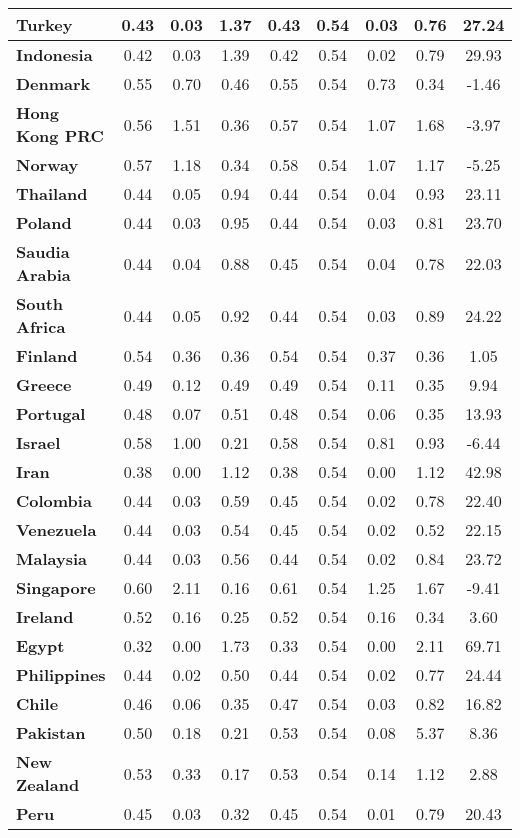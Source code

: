 \documentclass{article}
\begin{document}
\begin{center}
\begin{table}
\begin{small}
\begin{tabular}{|l|c|c|c|c|c|c|c|c|}
\textbf{Turkey}&0.43&0.03&1.37&0.43&0.54&0.03&0.76&27.24\\\hline
\textbf{Indonesia}&0.42&0.03&1.39&0.42&0.54&0.02&0.79&29.93\\\hline
\textbf{Denmark}&0.55&0.70&0.46&0.55&0.54&0.73&0.34&-1.46\\\hline
\textbf{Hong Kong PRC}&0.56&1.51&0.36&0.57&0.54&1.07&1.68&-3.97\\\hline
\textbf{Norway}&0.57&1.18&0.34&0.58&0.54&1.07&1.17&-5.25\\\hline
\textbf{Thailand}&0.44&0.05&0.94&0.44&0.54&0.04&0.93&23.11\\\hline
\textbf{Poland}&0.44&0.03&0.95&0.44&0.54&0.03&0.81&23.70\\\hline
\textbf{Saudia Arabia}&0.44&0.04&0.88&0.45&0.54&0.04&0.78&22.03\\\hline
\textbf{South Africa}&0.44&0.05&0.92&0.44&0.54&0.03&0.89&24.22\\\hline
\textbf{Finland}&0.54&0.36&0.36&0.54&0.54&0.37&0.36&1.05\\\hline
\textbf{Greece}&0.49&0.12&0.49&0.49&0.54&0.11&0.35&9.94\\\hline
\textbf{Portugal}&0.48&0.07&0.51&0.48&0.54&0.06&0.35&13.93\\\hline
\textbf{Israel}&0.58&1.00&0.21&0.58&0.54&0.81&0.93&-6.44\\\hline
\textbf{Iran}&0.38&0.00&1.12&0.38&0.54&0.00&1.12&42.98\\\hline
\textbf{Colombia}&0.44&0.03&0.59&0.45&0.54&0.02&0.78&22.40\\\hline
\textbf{Venezuela}&0.44&0.03&0.54&0.45&0.54&0.02&0.52&22.15\\\hline
\textbf{Malaysia}&0.44&0.03&0.56&0.44&0.54&0.02&0.84&23.72\\\hline
\textbf{Singapore}&0.60&2.11&0.16&0.61&0.54&1.25&1.67&-9.41\\\hline
\textbf{Ireland}&0.52&0.16&0.25&0.52&0.54&0.16&0.34&3.60\\\hline
\textbf{Egypt}&0.32&0.00&1.73&0.33&0.54&0.00&2.11&69.71\\\hline
\textbf{Philippines}&0.44&0.02&0.50&0.44&0.54&0.02&0.77&24.44\\\hline
\textbf{Chile}&0.46&0.06&0.35&0.47&0.54&0.03&0.82&16.82\\\hline
\textbf{Pakistan}&0.50&0.18&0.21&0.53&0.54&0.08&5.37&8.36\\\hline
\textbf{New Zealand}&0.53&0.33&0.17&0.53&0.54&0.14&1.12&2.88\\\hline
\textbf{Peru}&0.45&0.03&0.32&0.45&0.54&0.01&0.79&20.43\\\hline

\end{tabular}
\end{small}
\end{table}
\end{center}
\end{document}

